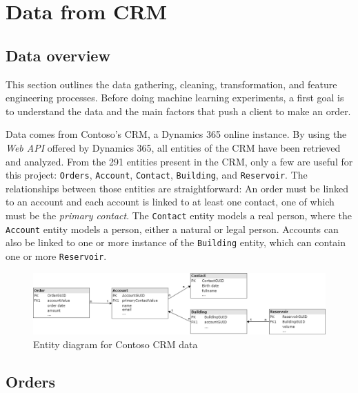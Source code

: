 \section{Data from CRM} \label{sec:crm-data}

\subsection{Data overview}
This section outlines the data gathering, cleaning, transformation, and feature engineering processes. Before doing machine learning experiments, a first goal is to understand the data and the main factors that push a client to make an order. 

Data comes from Contoso's CRM, a Dynamics 365 online instance. By using the \textit{Web API} offered by Dynamics 365, all entities of the CRM have been retrieved and analyzed. From the 291 entities present in the CRM, only a few are useful for this project: \texttt{Orders}, \texttt{Account}, \texttt{Contact}, \texttt{Building}, and \texttt{Reservoir}. The relationships between those entities are straightforward: An order must be linked to an account and each account is linked to at least one contact, one of which must be the \textit{primary contact}. The \texttt{Contact} entity models a real person, where the \texttt{Account} entity models a person, either a natural or legal person. Accounts can also be linked to one or more instance of the \texttt{Building} entity, which can contain one or more \texttt{Reservoir}.

\begin{figure}[h]
    \centering
    \includegraphics[width=12cm]{images/entityDiagram.png}
    \caption[Entity diagram of the CRM data]{Entity diagram for Contoso CRM data}
    \label{fig:entity-diagram}
\end{figure}

\subsection{Orders}\label{sec:crm-orders}

